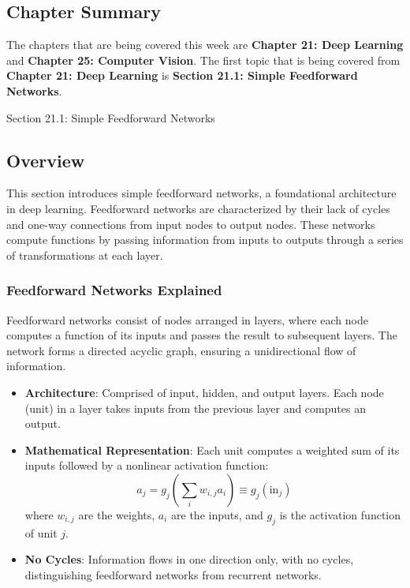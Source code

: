 \subsection{Chapter Summary}

The chapters that are being covered this week are \textbf{Chapter 21: Deep Learning} and \textbf{Chapter 25: Computer Vision}. The first topic that is being covered from \textbf{Chapter 21: Deep Learning}
is \textbf{Section 21.1: Simple Feedforward Networks}.

\begin{notes}{Section 21.1: Simple Feedforward Networks}
    \subsection*{Overview}

    This section introduces simple feedforward networks, a foundational architecture in deep learning. Feedforward networks are characterized by their lack of cycles and one-way connections from input 
    nodes to output nodes. These networks compute functions by passing information from inputs to outputs through a series of transformations at each layer.
    
    \subsubsection*{Feedforward Networks Explained}
    
    Feedforward networks consist of nodes arranged in layers, where each node computes a function of its inputs and passes the result to subsequent layers. The network forms a directed acyclic graph, 
    ensuring a unidirectional flow of information.
    
    \begin{highlight}
    
        \begin{itemize}
            \item \textbf{Architecture}: Comprised of input, hidden, and output layers. Each node (unit) in a layer takes inputs from the previous layer and computes an output.
            \item \textbf{Mathematical Representation}: Each unit computes a weighted sum of its inputs followed by a nonlinear activation function:
            \[
            a_j = g_j\left(\sum_{i} w_{i,j}a_i\right) \equiv g_j(\text{in}_j)
            \]
            where $w_{i,j}$ are the weights, $a_i$ are the inputs, and $g_j$ is the activation function of unit $j$.
            \item \textbf{No Cycles}: Information flows in one direction only, with no cycles, distinguishing feedforward networks from recurrent networks.
        \end{itemize}
    

\end{highlight}
\end{notes}
